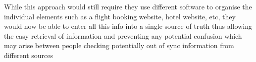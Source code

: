 While this approach would still require they use different software to organise the individual elements such as a flight booking website, hotel website, etc, they would now be able to enter all this info into a single source of truth thus allowing the easy retrieval of information and preventing any potential confusion which may arise between people checking potentially out of sync information from different sources






